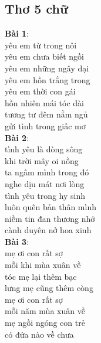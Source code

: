 \documentclass[a4paper]{article}
\theoremstyle{definition}
\begin{document}
\subsection{Thơ 5 chữ}
\textbf{Bài 1}:\\
 yêu em từ trong nôi \\
 yêu em chưa biết ngồi \\
 yêu em những ngây dại \\
 yêu em hồn trắng trong \\
 yêu em thời con gái \\
 hồn nhiên mái tóc dài \\
 tương tư đêm nằm ngủ \\
 gửi tình trong giấc mơ\\
\textbf{Bài 2}: \\
 tình yêu là dòng sông \\
 khi trời mây oi nồng \\
 ta ngâm mình trong đó \\
 nghe dịu mát nơi lòng \\
 tình yêu trong hy sinh \\
 luôn quên bản thân mình\\ 
 niềm tin đan thương nhớ \\
 cành duyên nở hoa xinh\\
\textbf{Bài 3}:\\
 mẹ ơi con rất sợ \\
 mỗi khi mùa xuân về \\
 tóc mẹ lại thêm bạc \\
 lưng mẹ cũng thêm còng \\
 mẹ ơi con rất sợ \\
 mỗi năm mùa xuân về \\
 mẹ ngồi ngóng con trẻ \\
 có đứa nào về chưa\\
\end{document}
